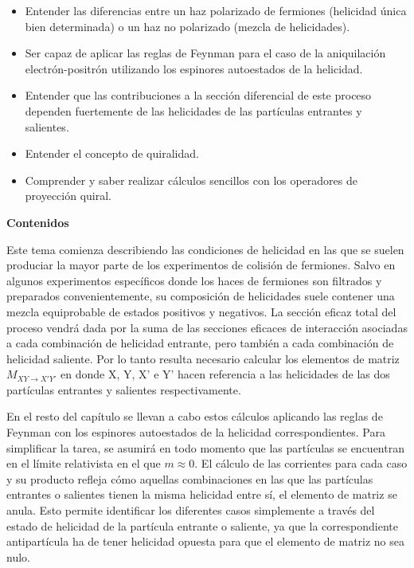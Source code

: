 \begin{itemize}
    \item Entender las diferencias entre un haz polarizado de fermiones (helicidad única bien determinada) o un haz no polarizado (mezcla de helicidades).
    \item Ser capaz de aplicar las reglas de Feynman para el caso de la aniquilación electrón-positrón utilizando los espinores autoestados de la helicidad.
    \item Entender que las contribuciones a la sección diferencial de este proceso dependen fuertemente de las helicidades de las partículas entrantes y salientes. 
    \item Entender el concepto de quiralidad.
    \item Comprender y saber realizar cálculos sencillos con los operadores de proyección quiral.
\end{itemize}

\textbf{Contenidos}

Este tema comienza describiendo las condiciones de helicidad en las que se suelen produciar la mayor parte de los experimentos de colisión de fermiones. Salvo en algunos experimentos específicos donde los haces de fermiones son filtrados y preparados convenientemente, su composición de helicidades suele contener una mezcla equiprobable de estados positivos y negativos. La sección eficaz total del proceso vendrá dada por la suma de las secciones eficaces de interacción asociadas a cada combinación de helicidad entrante, pero también a cada combinación de helicidad saliente. Por lo tanto resulta necesario calcular los elementos de matriz $M_{XY\rightarrow X'Y'}$ en donde X, Y, X' e Y' hacen referencia a las helicidades de las dos partículas entrantes y salientes respectivamente.

En el resto del capítulo se llevan a cabo estos cálculos aplicando las reglas de Feynman con los espinores autoestados de la helicidad correspondientes. Para simplificar la tarea, se asumirá en todo momento que las partículas se encuentran en el límite relativista en el que $m\approx 0$. El cálculo de las corrientes para cada caso y su producto refleja cómo aquellas combinaciones en las que las partículas entrantes o salientes tienen la misma helicidad entre sí, el elemento de matriz se anula. Esto permite identificar los diferentes casos simplemente a través del estado de helicidad de la partícula entrante o saliente, ya que la correspondiente antipartícula ha de tener helicidad opuesta para que el elemento de matriz no sea nulo. 

